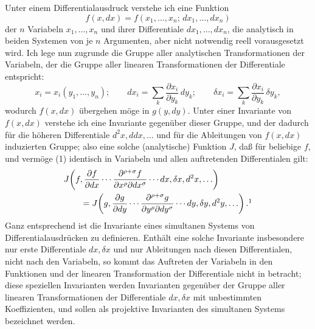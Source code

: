 \documentclass[11pt]{article}
\begin{document}
Unter einem Differentialausdruck verstehe ich eine Funktion
\[
f(x,dx)=f(x_1,\ldots,x_n;\,dx_1,\ldots,dx_n)
\]
der \(n\) Variabeln \(x_1,\ldots,x_n\) und ihrer Differentiale
\(dx_1,\ldots,dx_n\), die analytisch in beiden Systemen von je
\(n\) Argumenten, aber nicht notwendig reell vorausgesetzt wird.
Ich lege nun zugrunde die Gruppe aller analytischen Transformationen
der Variabeln, der die Gruppe aller linearen Transformationen der
Differentiale entspricht:
\begin{equation}
x_i=x_i(y_1,\ldots,y_n);\qquad
dx_i=\sum_k\frac{\partial x_i}{\partial y_k}\,dy_k;\qquad
\delta x_i=\sum_k\frac{\partial x_i}{\partial y_k}\,\delta y_k,
\tag{1}
\end{equation}
wodurch \(f(x,dx)\) übergehen möge in \(g(y,dy)\). Unter einer
Invariante von \(f(x,dx)\) verstehe ich eine Invariante gegenüber
dieser Gruppe, und der dadurch für die höheren Differentiale
\(d^2x,ddx,\ldots\) und für die Ableitungen von \(f(x,dx)\)
induzierten Gruppe; also eine solche (analytische) Funktion \(J\),
daß für beliebige \(f\), und vermöge (1) identisch in Variabeln und
allen auftretenden Differentialen gilt:
\[
\begin{aligned}
&J\!\left(f,\frac{\partial f}{\partial dx}\cdots
\frac{\partial^{\rho+\sigma}f}{\partial x^\rho\partial dx^\sigma}
\cdots dx,\delta x,d^2x,\ldots\right)\\
&\qquad =
J\!\left(g,\frac{\partial g}{\partial dy}\cdots
\frac{\partial^{\rho+\sigma}g}{\partial y^\rho\partial dy^\sigma}
\cdots dy,\delta y,d^2y,\ldots\right).\footnotemark
\end{aligned}
\]
Ganz entsprechend ist die Invariante eines simultanen Systems von
Differentialausdrücken zu definieren. Enthält eine solche Invariante
insbesondere nur erste Differentiale \(dx,\delta x\) und nur Ableitungen
nach diesen Differentialen, nicht nach den Variabeln, so kommt das
Auftreten der Variabeln in den Funktionen und der linearen
Transformation der Differentiale nicht in betracht; diese speziellen
Invarianten werden Invarianten gegenüber der Gruppe aller linearen
Transformationen der Differentiale \(dx,\delta x\) mit unbestimmten
Koeffizienten, und sollen als projektive Invarianten des simultanen
Systems bezeichnet werden.
\end{document}
